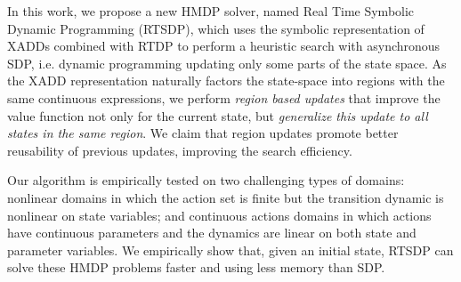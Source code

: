 In this work, we propose a new HMDP solver, named Real Time Symbolic Dynamic Programming (RTSDP), which uses the symbolic representation of XADDs combined with RTDP to perform a heuristic search with asynchronous SDP, i.e. dynamic programming updating only some parts of the state space.
As the XADD representation naturally factors the state-space into regions with the same continuous expressions, we perform \emph{region based updates} that improve the value function not only for the current state, but \emph{generalize this update to all states in the same region}. We claim that region updates promote better reusability of previous updates, improving the search efficiency. 

Our algorithm is empirically tested on two challenging types of domains: nonlinear domains in which the action set is finite but the transition dynamic is nonlinear on state variables; and continuous actions domains in which actions have continuous parameters and the dynamics are linear on both state and parameter variables.
We empirically show that, given an initial state, RTSDP can solve these HMDP problems faster and using less memory than SDP.
